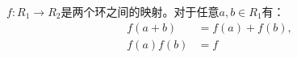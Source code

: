 
\begin{definition}{}
$f:R_1\rightarrow R_2$是两个环之间的映射。对于任意$a,b\in R_1$有：
\begin{equation}
\begin{aligned}
f(a+b)&=f(a)+f(b),\\
f(a)f(b)&=f
\end{aligned}
\end{equation}
\end{definition}
